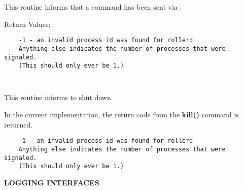 \begin{description}
This routine informs  that a command has been sent via
.

Return Values:

\begin{verbatim}
    -1 - an invalid process id was found for rollerd
    Anything else indicates the number of processes that were signaled.
    (This should only ever be 1.)
\end{verbatim}

\item {}\verb" "

This routine informs  to shut down.

In the current implementation, the return code from the {\bf kill()} command is
returned.

\begin{verbatim}
    -1 - an invalid process id was found for rollerd
    Anything else indicates the number of processes that were signaled.
    (This should only ever be 1.)
\end{verbatim}

\end{description}

{\bf LOGGING INTERFACES}

